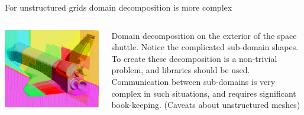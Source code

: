 \documentclass[aspectratio=169]{beamer}
\begin{document}
\begin{frame}{For unstructured grids domain decomposition is more
    complex}

  \begin{columns}
    
    \begin{column}{0.6\linewidth}
      \includegraphics[width=\linewidth]{shuttle16partitions.png}
    \end{column}
    
    \begin{column}{0.4\linewidth}
      Domain decomposition on the exterior of the space
      shuttle. Notice the complicated sub-domain shapes. To create
      these decomposition is a non-trivial problem, and libraries
      should be used. Communication between sub-domains is very
      complex in such situations, and requires significant
      book-keeping. (Caveats about unstructured meshes)
    \end{column}
  \end{columns}  

\end{frame}
\end{document}
